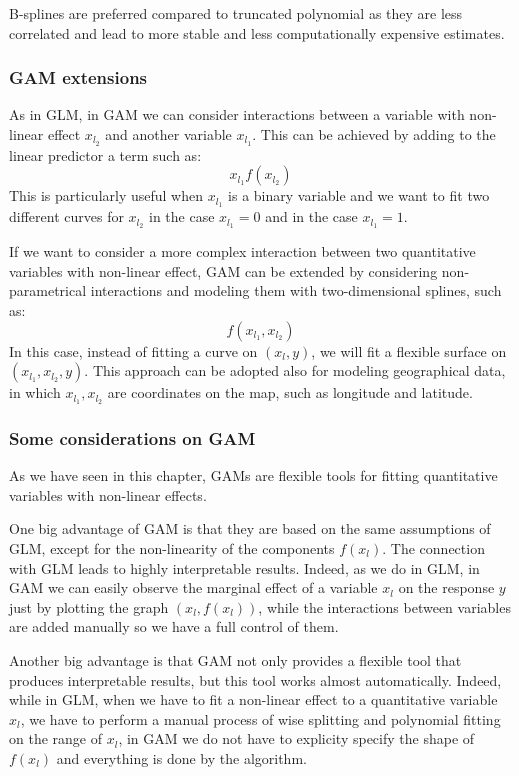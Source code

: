 \documentclass[a4paper, nobind]{templates/ociamthesis}
\theoremstyle{definition}
\theoremstyle{definition}
\theoremstyle{definition}
\theoremstyle{remark}
\begin{document}
B-splines are preferred compared to truncated polynomial as they are less correlated and lead to more stable and less computationally expensive estimates.

\hypertarget{gam-extensions}{%
\subsubsection{GAM extensions}\label{gam-extensions}}

As in GLM, in GAM we can consider interactions between a variable with non-linear effect \(x_{l_2}\) and another variable \(x_{l_1}\). This can be achieved by adding to the linear predictor a term such as:
\[
x_{l_1} f(x_{l_2})
\]
This is particularly useful when \(x_{l_1}\) is a binary variable and we want to fit two different curves for \(x_{l_2}\) in the case \(x_{l_1}=0\) and in the case \(x_{l_1}=1\).

If we want to consider a more complex interaction between two quantitative variables with non-linear effect, GAM can be extended by considering non-parametrical interactions and modeling them with two-dimensional splines, such as:
\[
f(x_{l_1}, x_{l_2})
\]
In this case, instead of fitting a curve on \((x_l, y)\), we will fit a flexible surface on \((x_{l_1}, x_{l_2}, y)\). This approach can be adopted also for modeling geographical data, in which \(x_{l_1}, x_{l_2}\) are coordinates on the map, such as longitude and latitude.

\hypertarget{some-considerations-on-gam}{%
\subsubsection{Some considerations on GAM}\label{some-considerations-on-gam}}

As we have seen in this chapter, GAMs are flexible tools for fitting quantitative variables with non-linear effects.

One big advantage of GAM is that they are based on the same assumptions of GLM, except for the non-linearity of the components \(f(x_{l})\). The connection with GLM leads to highly interpretable results. Indeed, as we do in GLM, in GAM we can easily observe the marginal effect of a variable \(x_l\) on the response \(y\) just by plotting the graph \(\left(x_l, f(x_l)\right)\), while the interactions between variables are added manually so we have a full control of them.

Another big advantage is that GAM not only provides a flexible tool that produces interpretable results, but this tool works almost automatically. Indeed, while in GLM, when we have to fit a non-linear effect to a quantitative variable \(x_l\), we have to perform a manual process of wise splitting and polynomial fitting on the range of \(x_l\), in GAM we do not have to explicity specify the shape of \(f(x_l)\) and everything is done by the algorithm.
\end{document}
